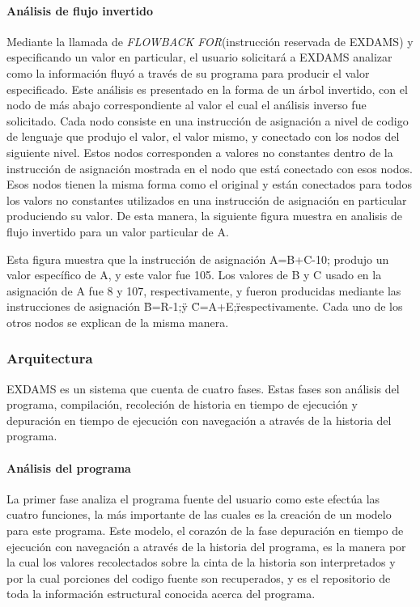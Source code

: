 \documentclass[12pt,a4paper]{report}
\begin{document}
			\paragraph[Análisis de flujo]{Análisis de flujo invertido}

Mediante la llamada de \textit{FLOWBACK FOR}(instrucción reservada de EXDAMS) y especificando un valor en particular, el usuario solicitará a EXDAMS analizar como la información fluyó a través de su programa para producir el valor especificado.  Este análisis es presentado en la forma de un árbol invertido, con el nodo de más abajo correspondiente al valor el cual el análisis inverso fue solicitado.  Cada nodo consiste en una instrucción de asignación a nivel de codigo de lenguaje que produjo el valor, el valor mismo, y conectado con los nodos del siguiente nivel.  Estos nodos corresponden a valores no constantes dentro de la instrucción de asignación mostrada en el nodo que está conectado con esos nodos.  Esos nodos tienen la misma forma como el original y están conectados para todos los valors no constantes utilizados en una instrucción de asignación en particular produciendo su valor.  De esta manera, la siguiente figura muestra en analisis de flujo invertido para un valor particular de A. 

Esta figura muestra que la instrucción de asignación A=B+C-10; produjo un valor específico de A, y este valor fue 105.  Los valores de B y C usado en la asignación de A fue 8 y 107, respectivamente, y fueron producidas mediante las instrucciones de asignación \"B=R-1;\" y \"C=A+E;\" respectivamente.  Cada uno de los otros nodos se explican de la misma manera.

			\subsubsection{Arquitectura}

EXDAMS es un sistema que cuenta de cuatro fases.  Estas fases son análisis del programa, compilación, recoleción de historia en tiempo de ejecución y depuración en tiempo de ejecución con navegación a através de la historia del programa.

				\paragraph{Análisis del programa}

La primer fase analiza el programa fuente del usuario como este efectúa las cuatro funciones, la más importante de las cuales es la creación de un modelo para este programa.  Este modelo, el corazón de la fase depuración en tiempo de ejecución con navegación a através de la historia del programa, es la manera por la cual los valores recolectados sobre la cinta de la historia son interpretados y por la cual porciones del codigo fuente son recuperados, y es el repositorio de toda la información estructural conocida acerca del programa.
\end{document}
